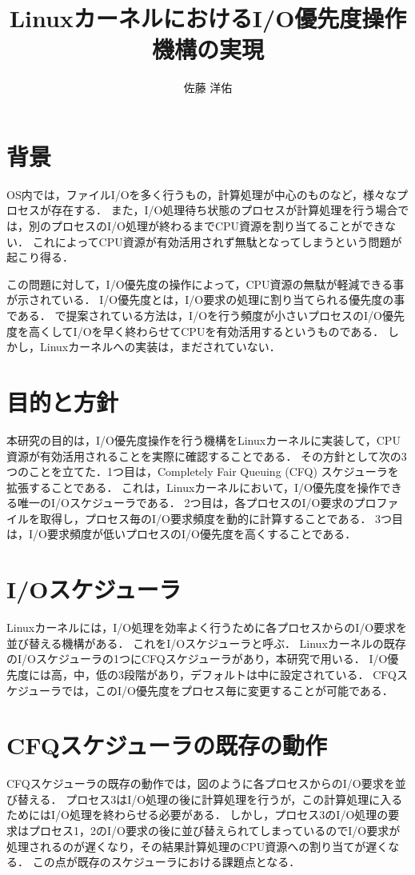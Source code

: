 \documentclass[]{iplresume} %
\title{LinuxカーネルにおけるI/O優先度操作機構の実現}
\author{佐藤 洋佑}
\begin{document}
\maketitle
\section{背景}
OS内では，ファイルI/Oを多く行うもの，計算処理が中心のものなど，様々なプロセスが存在する．
また，I/O処理待ち状態のプロセスが計算処理を行う場合では，別のプロセスのI/O処理が終わるまでCPU資源を割り当てることができない．
これによってCPU資源が有効活用されず無駄となってしまうという問題が起こり得る．

この問題に対して，I/O優先度の操作によって，CPU資源の無駄が軽減できる事が示されている\cite{tanji}．
I/O優先度とは，I/O要求の処理に割り当てられる優先度の事である．
\cite{tanji}で提案されている方法は，I/Oを行う頻度が小さいプロセスのI/O優先度を高くしてI/Oを早く終わらせてCPUを有効活用するというものである．
しかし，Linuxカーネルへの実装は，まだされていない．
\section{目的と方針}
本研究の目的は，I/O優先度操作を行う機構をLinuxカーネルに実装して，CPU資源が有効活用されることを実際に確認することである．
その方針として次の3つのことを立てた．1つ目は，Completely Fair Queuing (CFQ) スケジューラを拡張することである．
これは，Linuxカーネルにおいて，I/O優先度を操作できる唯一のI/Oスケジューラである．
2つ目は，各プロセスのI/O要求のプロファイルを取得し，プロセス毎のI/O要求頻度を動的に計算することである．
3つ目は，I/O要求頻度が低いプロセスのI/O優先度を高くすることである．
\section{I/Oスケジューラ}
Linuxカーネルには，I/O処理を効率よく行うために各プロセスからのI/O要求を並び替える機構がある．
これをI/Oスケジューラと呼ぶ．
Linuxカーネルの既存のI/Oスケジューラの1つにCFQスケジューラがあり，本研究で用いる．
I/O優先度には高，中，低の3段階があり，デフォルトは中に設定されている．
CFQスケジューラでは，このI/O優先度をプロセス毎に変更することが可能である．
\section{CFQスケジューラの既存の動作}
CFQスケジューラの既存の動作では，図のように各プロセスからのI/O要求を並び替える．
プロセス3はI/O処理の後に計算処理を行うが，この計算処理に入るためにはI/O処理を終わらせる必要がある．
しかし，プロセス3のI/O処理の要求はプロセス1，2のI/O要求の後に並び替えられてしまっているのでI/O要求が処理されるのが遅くなり，その結果計算処理のCPU資源への割り当てが遅くなる．
この点が既存のスケジューラにおける課題点となる．
\end{document}
